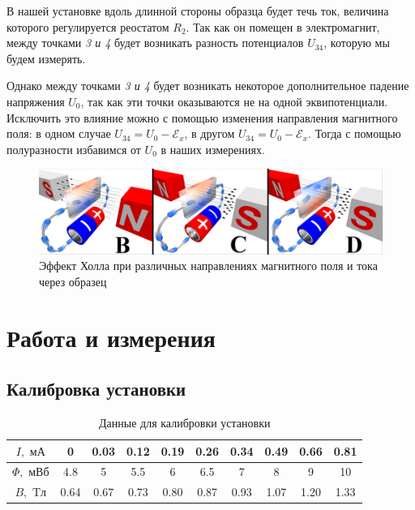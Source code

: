 \documentclass[a4paper, 12pt]{article}
\begin{document}
В нашей установке вдоль длинной стороны образца будет течь ток, величина которого регулируется реостатом $R_2$. Так как он помещен в электромагнит, между точками \textit{3 и 4} будет возникать разность потенциалов $U_{34}$, которую мы будем измерять. 

Однако между точками \textit{3 и 4} будет возникать некоторое дополнительное падение напряжения $U_{0}$, так как эти точки оказываются не на одной эквипотенциали. Исключить это влияние можно с помощью изменения направления магнитного поля: в одном случае $U_{34} = U_{0} - \mathscr{E}_x $, в другом  $U_{34} = U_0 - \mathscr{E}_x $. Тогда с помощью полуразности избавимся от $U_{0}$ в наших измерениях. 

\begin{figure}[H]
	\begin{center}
		\includegraphics[width = 0.6 \textwidth]{Hall_dif}
		\caption{Эффект Холла при различных направлениях магнитного поля и тока через образец}
	\end{center}
\end{figure}

\section{Работа и измерения}

\subsection*{Калибровка установки}

\begin{table}[H]
\centering
\begin{tabular}{|c|c|c|c|c|c|c|c|c|c|}
\hline
$I, \text{ мА}$     & 0    & 0.03 & 0.12 & 0.19 & 0.26 & 0.34 & 0.49 & 0.66 & 0.81 \\ \hline
$\Phi, \text{ мВб}$ & 4.8  & 5    & 5.5  & 6    & 6.5  & 7    & 8    & 9    & 10   \\ \hline
$B, \text{ Tл}$      & 0.64 & 0.67 & 0.73 & 0.80 & 0.87 & 0.93 & 1.07 & 1.20 & 1.33 \\ \hline
\end{tabular}
\caption{Данные для калибровки установки}
\end{table}
\end{document}
